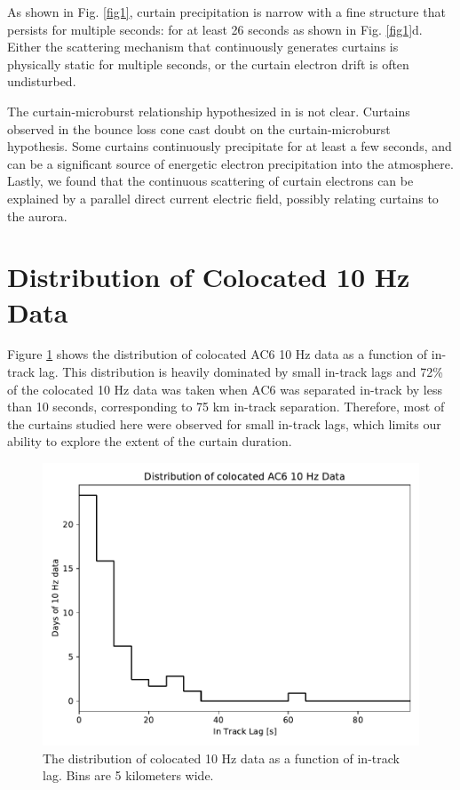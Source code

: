 \documentclass[draft]{agujournal2019}
\begin{document}
As shown in Fig. \ref{fig1}, curtain precipitation is narrow with a fine structure that persists for multiple seconds: for at least 26 seconds as shown in Fig. \ref{fig1}d. Either the scattering mechanism that continuously generates curtains is physically static for multiple seconds, or the curtain electron drift is often undisturbed. 

The curtain-microburst relationship hypothesized in  is not clear. Curtains observed in the bounce loss cone cast doubt on the curtain-microburst hypothesis. Some curtains continuously precipitate for at least a few seconds, and can be a significant source of energetic electron precipitation into the atmosphere. Lastly, we found that the continuous scattering of curtain electrons can be explained by a parallel direct current electric field, possibly relating curtains to the aurora.

\appendix

\section{Distribution of Colocated 10 Hz Data}
Figure \ref{a_10Hz_dist} shows the distribution of colocated AC6 10 Hz data as a function of in-track lag. This distribution is heavily dominated by small in-track lags and 72\% of the colocated 10 Hz data was taken when AC6 was separated in-track by less than 10 seconds, corresponding to 75 km in-track separation. Therefore, most of the curtains studied here were observed for small in-track lags, which limits our ability to explore the extent of the curtain duration.

\begin{figure}
\includegraphics[width=\textwidth]{a_10hz_dist.pdf}
\caption{The distribution of colocated 10 Hz data as a function of in-track lag. Bins are 5 kilometers wide.}
\label{a_10Hz_dist}
\end{figure}
\end{document}
